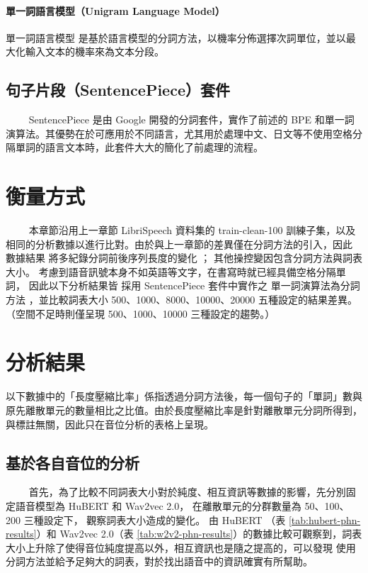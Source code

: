 \paragraph{單一詞語言模型（Unigram Language Model）}

單一詞語言模型 \cite{kudo2018subword} 是基於語言模型的分詞方法，以機率分佈選擇次詞單位，並以最大化輸入文本的機率來為文本分段。


\subsection{句子片段（SentencePiece）套件}

　　
SentencePiece \cite{kudo_sentencepiece_2018}
是由 Google 開發的分詞套件，實作了前述的 BPE 和單一詞演算法。其優勢在於可應用於不同語言，尤其用於處理中文、日文等不使用空格分隔單詞的語言文本時，此套件大大的簡化了前處理的流程。



\section{衡量方式}
　　
本章節沿用上一章節 LibriSpeech 資料集的 train-clean-100 訓練子集，以及相同的分析數據以進行比對。由於與上一章節的差異僅在分詞方法的引入，因此
數據結果
將多紀錄分詞前後序列長度的變化
；
其他操控變因包含分詞方法與詞表大小。
考慮到語音訊號本身不如英語等文字，在書寫時就已經具備空格分隔單詞，
因此以下分析結果皆
採用 SentencePiece 套件中實作之
單一詞演算法為分詞方法
，並比較詞表大小 500、1000、8000、10000、20000 五種設定的結果差異。（空間不足時則僅呈現 500、1000、10000 三種設定的趨勢。）

\section{分析結果}

以下數據中的「長度壓縮比率」係指透過分詞方法後，每一個句子的「單詞」數與原先離散單元的數量相比之比值。由於長度壓縮比率是針對離散單元分詞所得到，與標註無關，因此只在音位分析的表格上呈現。

\subsection{基於各自音位的分析}
　　
首先，為了比較不同詞表大小對於純度、相互資訊等數據的影響，先分別固定語音模型為 HuBERT 和 Wav2vec 2.0，
在離散單元的分群數量為 50、100、200 三種設定下，
觀察詞表大小造成的變化。
由 HuBERT （表 \ref{tab:hubert-phn-results}）和 Wav2vec 2.0（表 \ref{tab:w2v2-phn-results}）的數據比較可觀察到，詞表大小上升除了使得音位純度提高以外，相互資訊也是隨之提高的，可以發現
使用分詞方法並給予足夠大的詞表，對於找出語音中的資訊確實有所幫助。

